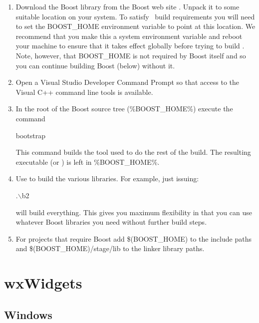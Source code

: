 \begin{enumerate}

\item Download the Boost library from the Boost web site \cite{boost}. Unpack it to some
  suitable location on your system. To satisfy \VTank\ build requirements you will need to set
  the BOOST\_HOME environment variable to point at this location. We recommend that you make
  this a system environment variable and reboot your machine to ensure that it takes effect
  globally before trying to build \VTank. Note, however, that BOOST\_HOME is not required by
  Boost itself and so you can continue building Boost (below) without it.

\item Open a Visual Studio Developer Command Prompt so that access to the Visual C++ command
  line tools is available.

\item In the root of the Boost source tree (\%BOOST\_HOME\%) execute the command
\begin{commands}
bootstrap
\end{commands}

This command builds the  tool used to do the rest of the build. The resulting
executable  (or ) is left in \%BOOST\_HOME\%.

\item Use  to build the various libraries. For example, just issuing:
  \begin{commands}
    .$\backslash$b2
  \end{commands}

  will build everything. This gives you maximum flexibility in that you can use whatever Boost
  libraries you need without further build steps.

\item For projects that require Boost add \$(BOOST\_HOME) to the include paths and
  \$(BOOST\_HOME)/stage/lib to the linker library paths.

\end{enumerate}

\section{wxWidgets}

\subsection{Windows}


